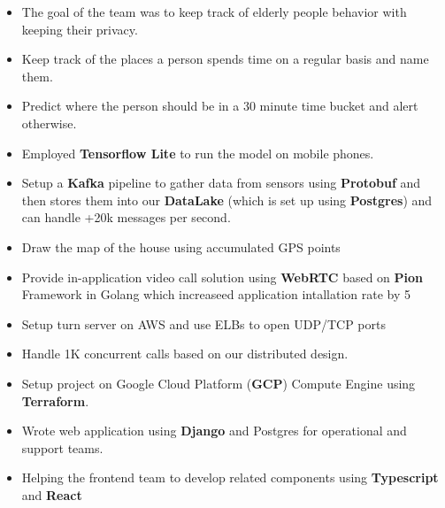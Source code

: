 \vspace{0.5cm}

\begin{itemize}
      \item The goal of the team was to keep track of elderly people behavior with keeping their privacy.
      \item Keep track of the places a person spends time on a regular basis and name them.
      \item Predict where the person should be in a 30 minute time bucket and alert otherwise.
      \item Employed \textbf{Tensorflow Lite} to run the model on mobile phones.
      \item Setup a \textbf{Kafka} pipeline to gather data from sensors using \textbf{Protobuf} and
            then stores them into our \textbf{DataLake} (which is set up using \textbf{Postgres}) and can handle +20k messages per second.
      \item Draw the map of the house using accumulated GPS points
      \item Provide in-application video call solution using \textbf{WebRTC} based on \textbf{Pion} Framework in Golang which increaseed application intallation rate by 5%
      \item Setup turn server on AWS and use ELBs to open UDP/TCP ports
      \item Handle 1K concurrent calls based on our distributed design.
      \item Setup project on Google Cloud Platform (\textbf{GCP}) Compute Engine using \textbf{Terraform}.
      \item Wrote web application using \textbf{Django} and Postgres for operational and support teams.
      \item Helping the frontend team to develop related components using \textbf{Typescript} and \textbf{React}
\end{itemize}

